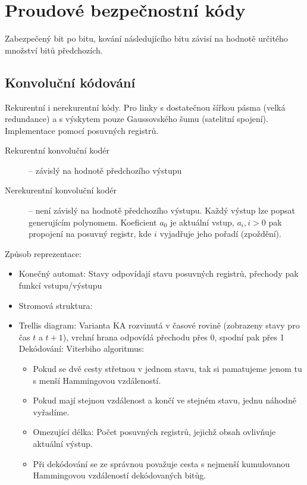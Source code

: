 \documentclass[a4paper, 11pt]{report}
\begin{document}
\section{Proudové bezpečnostní kódy}
Zabezpečený bit po bitu, kování následujícího bitu závisí na hodnotě určitého množství bitů předchozích.

\subsection{Konvoluční kódování}
Rekurentní i nerekurentní kódy. Pro linky s dostatečnou šířkou pásma (velká redundance) a s výskytem pouze Gaussovského šumu (satelitní spojení). Implementace pomocí posuvných registrů.

\begin{description}
	\item[Rekurentní konvoluční kodér] -- závislý na hodnotě předchozího výstupu
	\item[Nerekurentní konvoluční kodér] -- není závislý na hodnotě předchozího výstupu. Každý výstup lze popsat generujícím polynomem. Koeficient $a_0$ je aktuální vstup, $a_i, i > 0$ pak propojení na posuvný registr, kde $i$ vyjadřuje jeho pořadí (zpoždění).
\end{description}

Způsob reprezentace:
\begin{itemize}
	\item Konečný automat: Stavy odpovídají stavu posuvných registrů, přechody pak funkcí vstupu/výstupu
	\item Stromová struktura:
	\item Trellis diagram: Varianta KA rozvinutá v časové rovině (zobrazeny stavy pro čas $t$ a $t+1$), vrchní hrana odpovídá přechodu přes 0, spodní pak přes 1\\
	Dekódování: Viterbiho algoritmus:
	\begin{itemize}
		\item Pokud se dvě cesty střetnou v jednom stavu, tak si pamatujeme jenom tu s menší Hammingovou vzdáleností.
		\item Pokud mají stejnou vzdálenost a končí ve stejném stavu, jednu náhodně vyřadíme.
		\item Omezující délka: Počet posuvných registrů, jejichž obsah ovlivňuje aktuální výstup.
		\item Při dekódování se ze správnou považuje cesta s nejmenší kumulovanou Hammingovou vzdáleností dekódovaných bitůg.
	\end{itemize}
\end{itemize}
\end{document}

